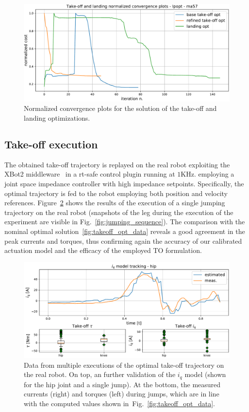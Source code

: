 \begin{figure}[t]
	\centering
	\includegraphics[width=1\columnwidth]{images/solver_conv_plots.pdf}
	\caption{Normalized convergence plots for the solution of the take-off and landing optimizations.}
	\label{fig:convergence_plots}
\end{figure}
\subsection{Take-off execution}
The obtained take-off trajectory is replayed on the real robot exploiting the XBot2 middleware~\cite{xbot::LAURENZI2023104379} in a rt-safe control plugin running at $1\mathrm{KHz}$. employing a joint space impedance controller with high impedance setpoints. Specifically, the optimal trajectory is fed to the robot employing both position and velocity references. Figure~\ref{fig:takeoff_execution} shows the results of the execution of a single jumping trajectory on the real robot (snapshots of the leg during the execution of the experiment are visible in Fig.~\ref{fig:jumping_sequence}). The comparison with the nominal optimal solution~\ref{fig:takeoff_opt_data} reveals a good agreement in the peak currents and torques, thus confirming again the accuracy of our calibrated actuation model and the efficacy of the employed TO formulation.
\begin{figure}[h]
	\centering
	\includegraphics[width=1\columnwidth]{images/hardware_saturation.pdf}
	\caption{Data from multiple executions of the optimal take-off trajectory on the real robot. On top, an further validation of the $i_q$ model (shown for the hip joint and a single jump). At the bottom, the measured currents (right) and torques (left) during  jumps, which are in line with the computed values shown in~Fig.~\ref{fig:takeoff_opt_data}.}
	\label{fig:takeoff_execution}
\end{figure}
